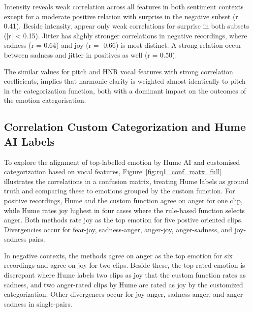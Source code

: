 Intensity reveals weak correlation across all features in both sentiment contexts except for a moderate positive relation with surprise in the negative subset (r = 0.41). Beside intensity, appear only weak correlations for surprise in both subsets (|r| < 0.15). 
Jitter has slighly stronger correlations in negative recordings, where sadness (r = 0.64) and joy (r = -0.66) is most distinct. A strong relation occur between sadness and jitter in positives as well (r = 0.50). 

The similar values for pitch and HNR vocal features with strong correlation coefficients, implies that harmonic clarity is weighted almost
identically to pitch in the categorization function, both with a dominant impact on the outcomes of the emotion categorisation. 

\subsection{Correlation Custom Categorization and Hume AI Labels}

To explore the alignment of top-labelled emotion by Hume AI and customised categorization based on vocal features, Figure~\ref{fig:rq1_conf_matx_full} illustrates the correlations in a confusion matrix, treating Hume labels as ground truth and comparing these to emotions grouped by the custom function.  
For positive recordings, Hume and the custom function agree on anger for one clip, while Hume rates joy highest in four cases where the rule-based function selects anger. 
Both methods rate joy as the top emotion for five postive oriented clips. Divergencies occur for fear-joy, sadness-anger, anger-joy, anger-sadness, and joy-sadness pairs. 
 
In negative contexts, the methods agree on anger as the top emotion for six recordings and agree on joy for two clips. 
Beside these, the top-rated emotion is discrepant where Hume labels two clips as joy that the custom function rates as sadness, and two anger-rated clips by Hume are rated as 
joy by the customized categorization. Other divergences occur for joy-anger, sadness-anger, and anger-sadness in single-pairs. 

